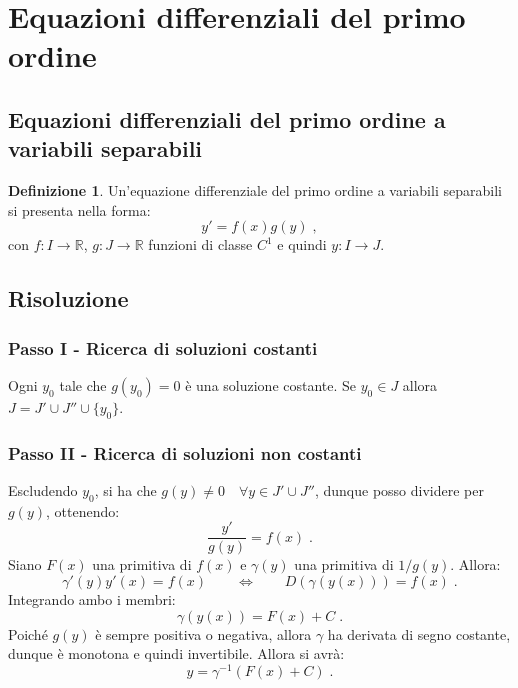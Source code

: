 \documentclass[a4paper,12pt]{report}
\theoremstyle{plain}
\theoremstyle{definition}
\newtheorem{defn}{Definizione}[section]
\theoremstyle{remark}
\numberwithin{equation}{section}
\begin{document}
\section{Equazioni differenziali del primo ordine}
\subsection{Equazioni differenziali del primo ordine a variabili separabili}
\begin{defn} Un'equazione differenziale del primo ordine a variabili separabili si presenta nella forma:
\begin{equation}
y'=f(x)g(y)\;,
\end{equation}
con $f:I \to \mathbb{R}$, $g:J \to \mathbb{R}$ funzioni di classe $C^1$ e quindi $y:I \to J$.
\end{defn}
\subsection*{Risoluzione}
\subsubsection*{Passo I - Ricerca di soluzioni costanti}
Ogni $y_0$ tale che $g(y_0)=0$ è una soluzione costante. Se $y_0 \in J$ allora $J=J'\cup J''\cup \{y_0\}$.
\subsubsection*{Passo II - Ricerca di soluzioni non costanti}
Escludendo $y_0$, si ha che $g(y) \ne 0 \quad \forall y \in J'\cup J''$, dunque posso dividere per $g(y)$, ottenendo:
\begin{equation}
\frac{y'}{g(y)}=f(x)\;.
\end{equation}
Siano $F(x)$ una primitiva di $f(x)$ e $\gamma(y)$ una primitiva di $1/g(y)$. Allora:
\begin{equation}
\gamma'(y)y'(x)=f(x) \qquad \Longleftrightarrow \qquad D(\gamma(y(x)))=f(x)\;.
\end{equation}
Integrando ambo i membri:
\begin{equation}
\gamma(y(x))=F(x)+C\;.
\end{equation}
Poiché $g(y)$ è sempre positiva o negativa, allora $\gamma$ ha derivata di segno costante, dunque è monotona e quindi invertibile. Allora si avrà:
\begin{equation}
y=\gamma^{-1}(F(x)+C)\;.
\end{equation}
\end{document}

